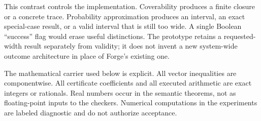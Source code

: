 This contrast controls the implementation. Coverability produces a finite closure or a concrete trace. Probability approximation produces an interval, an exact special-case result, or a valid interval that is still too wide. A single Boolean ``success'' flag would erase useful distinctions. The prototype retains a requested-width result separately from validity; it does not invent a new system-wide outcome architecture in place of Forge's existing one.

The mathematical carrier used below is explicit. All vector inequalities are componentwise. All certificate coefficients and all executed arithmetic are exact integers or rationals. Real numbers occur in the semantic theorems, not as floating-point inputs to the checkers. Numerical computations in the experiments are labeled diagnostic and do not authorize acceptance.
